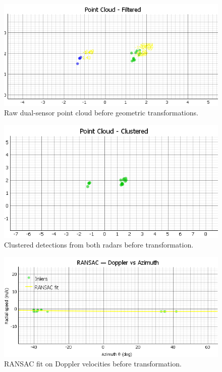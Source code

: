 \begin{figure}[!htbp]
    \centering
    \includegraphics[width=0.9\linewidth]{images/dualSensorCalib_2mts.png}
    \caption{Raw dual-sensor point cloud before geometric transformations.}
    \label{fig:dualSensorCalib_2mts}
\end{figure}

\begin{figure}[!htbp]
    \centering
    \includegraphics[width=0.9\linewidth]{images/dualSensorCalibCluster_2mts.png}
    \caption{Clustered detections from both radars before transformation.}
    \label{fig:dualSensorCalibCluster_2mts}
\end{figure}

\begin{figure}[!htbp]
    \centering
    \includegraphics[width=0.9\linewidth]{images/dualSensorCalibRANSAC_2mts.png}
    \caption{RANSAC fit on Doppler velocities before transformation.}
    \label{fig:dualSensorCalibRANSAC_2mts}
\end{figure}


